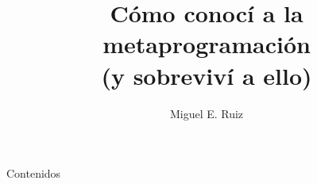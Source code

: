 \documentclass[14pt]{beamer}
\author[Miguel E. Ruiz]{Miguel E. Ruiz}
\title[\texttt{Madrid |> Elixir}]{Cómo conocí a la metaprogramación\\ (y sobreviví a ello)}
\date{\mydate}
\begin{document}
\begin{frame}
  \titlepage
\end{frame}

\begin{frame}{Contenidos}
\end{frame}
\end{document}
